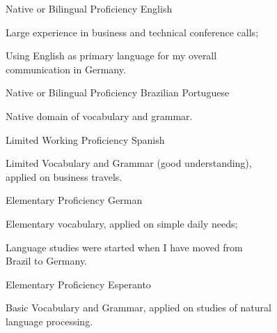 \noindent
\vspace{-0.1cm}
\begin{multicols}{2}
\begin{cventries}
\noindent
\cventry
        {Native or Bilingual Proficiency}
        {English}{}{}
        {
         \begin{cvitems}
           \item {Large experience in business and technical conference calls;}
           \item {Using English as primary
           language for my overall\\communication in Germany.}
          \end{cvitems}
        }
\cventry
        {Native or Bilingual Proficiency}
        {Brazilian Portuguese}{}{}
        {
         \begin{cvitems}
           \item {Native domain of vocabulary and grammar.\\}
          \end{cvitems}
        }
\cventry
        {Limited Working Proficiency}
        {Spanish}{}{}
        {
         \begin{cvitems}
           \item {Limited Vocabulary and Grammar (good understanding),\\applied on business travels.}
          \end{cvitems}
        }
\end{cventries}
\columnbreak
\begin{cventries}
\noindent
\cventry
        {Elementary Proficiency}
        {German}{}{}
        {
         \begin{cvitems}
           \item {Elementary vocabulary, applied on simple daily needs;}
           \item {Language studies were started when I have moved from\\Brazil to Germany.}
          \end{cvitems}
        }
\cventry
        {Elementary Proficiency}
        {Esperanto}{}{}
        {
         \begin{cvitems}
           \item {Basic Vocabulary and Grammar, applied on studies of natural \\language processing.}
          \end{cvitems}
        }
\end{cventries}
\end{multicols}

